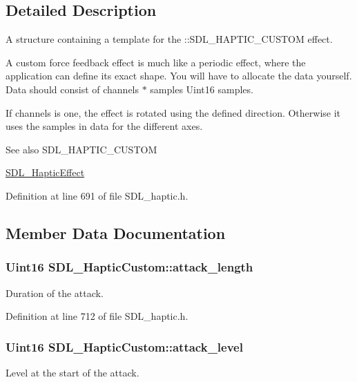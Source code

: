 \subsection{Detailed Description}
A structure containing a template for the \+::\+S\+D\+L\+\_\+\+H\+A\+P\+T\+I\+C\+\_\+\+C\+U\+S\+T\+O\+M effect. 

A custom force feedback effect is much like a periodic effect, where the application can define its exact shape. You will have to allocate the data yourself. Data should consist of channels $\ast$ samples Uint16 samples.

If channels is one, the effect is rotated using the defined direction. Otherwise it uses the samples in data for the different axes.

\begin{DoxySeeAlso}{See also}
S\+D\+L\+\_\+\+H\+A\+P\+T\+I\+C\+\_\+\+C\+U\+S\+T\+O\+M 

\hyperlink{unionSDL__HapticEffect}{S\+D\+L\+\_\+\+Haptic\+Effect} 
\end{DoxySeeAlso}


Definition at line 691 of file S\+D\+L\+\_\+haptic.\+h.



\subsection{Member Data Documentation}
\hypertarget{structSDL__HapticCustom_a018b35d89398c26e10d1fb4315d1dda1}{
\subsubsection[{attack\+\_\+length}]{\setlength{\rightskip}{0pt plus 5cm}Uint16 S\+D\+L\+\_\+\+Haptic\+Custom\+::attack\+\_\+length}}\label{structSDL__HapticCustom_a018b35d89398c26e10d1fb4315d1dda1}
Duration of the attack. 

Definition at line 712 of file S\+D\+L\+\_\+haptic.\+h.

\hypertarget{structSDL__HapticCustom_ad6e394e3775372af3eb9e02823987405}{
\subsubsection[{attack\+\_\+level}]{\setlength{\rightskip}{0pt plus 5cm}Uint16 S\+D\+L\+\_\+\+Haptic\+Custom\+::attack\+\_\+level}}\label{structSDL__HapticCustom_ad6e394e3775372af3eb9e02823987405}
Level at the start of the attack. 

